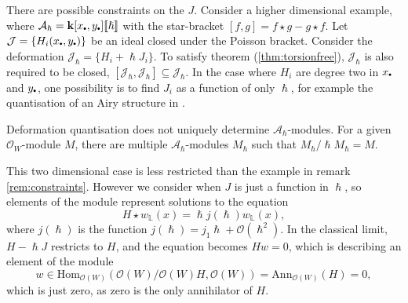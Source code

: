     \begin{rem}
    \label{rem:constraints}
    There are possible constraints on the \(J\). Consider a higher dimensional example, where  \( \mathcal{A}_{\hslash}= \mathbf{k}[x_{\sbt},y_{\sbt}] \lBrack \hslash \rBrack\) with the star-bracket \( [f,g] = f \star g - g \star f \). Let \( \mathcal{J} = \{H_i(x_{\sbt},y_{\sbt})\} \) be an ideal closed under the Poisson bracket. Consider the deformation \(\mathcal{J}_{\hslash} = \{ H_i + \hslash J_i \}\). To satisfy theorem (\ref{thm:torsionfree}), \(\mathcal{J}_{\hslash}\) is also required to be closed, \( [\mathcal{J}_{\hslash}, \mathcal{J}_{\hslash} ] \subseteq \mathcal{J}_{\hslash}\). In the case where \(H_i\) are degree two in \(x_{\sbt}\) and \( y_{\sbt}\), one possibility is to find \( J_i\) as a function of only \(\hslash\), for example the quantisation of an Airy structure in \cite{ks_airy}.
    \end{rem}
    
    \begin{rem}
    Deformation quantisation does not uniquely determine \( \mathcal{A}_{\hslash}\)-modules. For a given \( \mathcal{O}_W\)-module \(M\), there are multiple \( \mathcal{A}_{\hslash}\)-modules \(M_{\hslash}\) such that \(M_{\hslash}/\hslash M_{\hslash} = M\).
    \end{rem}
    This two dimensional case is less restricted than the example in remark \ref{rem:constraints}. However we consider when \(J\) is just a function in \(\hslash\), so elements of the module represent solutions to the equation
    \[ H \star w_{\mathbb{L}}(x) = \hslash j(\hslash) w_{\mathbb{L}}(x), \]
    where \( j(\hslash) \) is the function \( j(\hslash) = j_1 \hslash  + \mathcal{O}(\hslash^2)\). In the classical limit, \(H - \hslash J\) restricts to \( H\), and the equation becomes \( H w =0\), which is describing an element of the module 
    \[ w \in \mathrm{Hom}_{\mathcal{O}(W)}(\mathcal{O}(W)/  \mathcal{O}(W) H , \mathcal{O}(W) ) = \mathrm{Ann}_{\mathcal{O}(W)}(  H) =  0,\]
    which is just zero, as zero is the only annihilator of \(H\).
    

